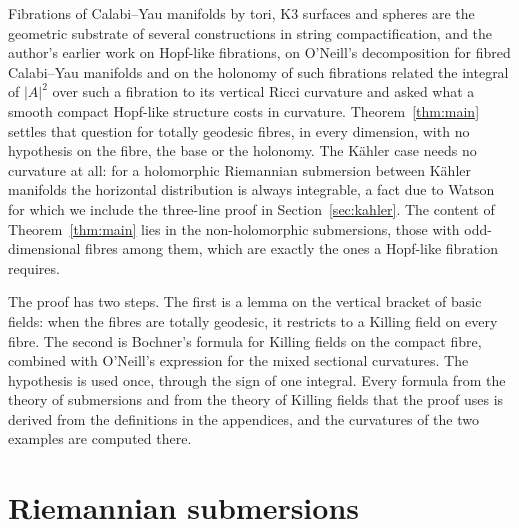 \documentclass[11pt,reqno]{amsart}
\theoremstyle{plain}
\theoremstyle{definition}
\begin{document}
Fibrations of Calabi--Yau manifolds by tori, K3 surfaces and spheres are the geometric substrate of several constructions in string compactification, and the author's earlier work on Hopf-like fibrations, on O'Neill's decomposition for fibred Calabi--Yau manifolds and on the holonomy of such fibrations \cite{Bhattacharjee2026Hopf,Bhattacharjee2026ONeill,Bhattacharjee2026Holonomy,Bhattacharjee2026Toric} related the integral of $|A|^2$ over such a fibration to its vertical Ricci curvature and asked what a smooth compact Hopf-like structure costs in curvature. Theorem~\ref{thm:main} settles that question for totally geodesic fibres, in every dimension, with no hypothesis on the fibre, the base or the holonomy. The K\"ahler case needs no curvature at all: for a holomorphic Riemannian submersion between K\"ahler manifolds the horizontal distribution is always integrable, a fact due to Watson \cite{Watson1976} for which we include the three-line proof in Section~\ref{sec:kahler}. The content of Theorem~\ref{thm:main} lies in the non-holomorphic submersions, those with odd-dimensional fibres among them, which are exactly the ones a Hopf-like fibration requires.

The proof has two steps. The first is a lemma on the vertical bracket of basic fields: when the fibres are totally geodesic, it restricts to a Killing field on every fibre. The second is Bochner's formula for Killing fields on the compact fibre, combined with O'Neill's expression for the mixed sectional curvatures. The hypothesis is used once, through the sign of one integral. Every formula from the theory of submersions and from the theory of Killing fields that the proof uses is derived from the definitions in the appendices, and the curvatures of the two examples are computed there.

\section{Riemannian submersions}\label{sec:prelim}
\end{document}
